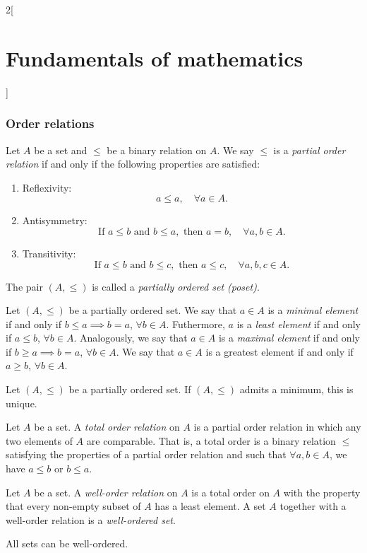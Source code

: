 \documentclass[../../../main.tex]{subfiles}
\begin{document}
\begin{multicols}{2}[\section{Fundamentals of mathematics}]
    \subsubsection*{Order relations}
    \begin{definition}\label{FM-order_relations}
        Let $A$ be a set and $\leq$ be a binary relation on $A$. We say $\leq$ is a \textit{partial order relation} if and only if the following properties are satisfied:
        \begin{enumerate}
            \item Reflexivity:
                  $$a\leq a,\quad\forall a\in A.$$
            \item Antisymmetry:
                  $$\text{If }a\leq b\text{ and }b\leq a,\text{ then }a=b,\quad\forall a,b\in A.$$
            \item Transitivity:
                  $$\text{If }a\leq b\text{ and }b\leq c,\text{ then }a\leq c,\quad\forall a,b,c\in A.$$
        \end{enumerate}
        The pair $(A,\leq)$ is called a \textit{partially ordered set (poset)}.
    \end{definition}
    \begin{definition}
        Let $(A,\leq)$ be a partially ordered set. We say that $a\in A$ is a \textit{minimal element} if and only if $b\leq a\implies b=a$, $\forall b\in A$. Futhermore, $a$ is a \textit{least element} if and only if $a\leq b$, $\forall b\in A$. Analogously, we say that $a\in A$ is a \textit{maximal element} if and only if $b\geq a\implies b=a$, $\forall b\in A$. We say that $a\in A$ is a greatest element if and only if $a\geq b$, $\forall b\in A$.
    \end{definition}
    \begin{lemma}
        Let $(A,\leq)$ be a partially ordered set. If $(A,\leq)$ admits a minimum, this is unique.
    \end{lemma}
    \begin{definition}
        Let $A$ be a set. A \textit{total order relation} on $A$ is a partial order relation in which any two elements of $A$ are comparable. That is, a total order is a binary relation $\leq$ satisfying the properties of a partial order relation and such that $\forall a,b\in A$, we have $a\leq b$ or $b\leq a$.
    \end{definition}
    \begin{definition}
        Let $A$ be a set. A \textit{well-order relation} on $A$ is a total order on $A$ with the property that every non-empty subset of $A$ has a least element. A set $A$ together with a well-order relation is a \textit{well-ordered set}.
    \end{definition}
    \begin{theorem}
        All sets can be well-ordered.
    \end{theorem}

\end{multicols}
\end{document}
